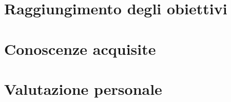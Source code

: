 \section{Raggiungimento degli obiettivi}

\section{Conoscenze acquisite}

\section{Valutazione personale}
